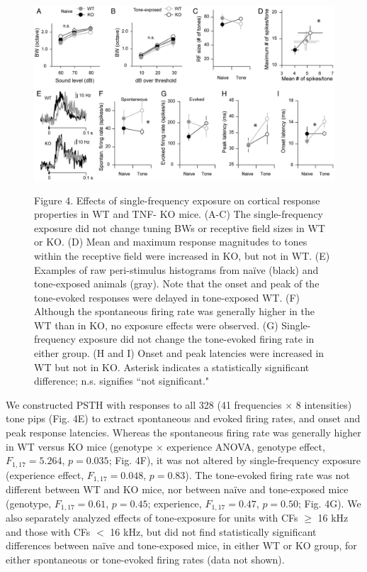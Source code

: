 \begin{figure}[h]
	\centering
		\includegraphics[width=6in]{images/C3F4}
	\begin{changemargin}{1in}{1in}
	\footnotesize{Figure 4. Effects of single-frequency exposure on cortical response properties in WT and TNF-\textalpha{} KO mice. (A-C) The single-frequency exposure did not change tuning BWs or receptive field sizes in WT or KO. (D) Mean and maximum response magnitudes to tones within the receptive field were increased in KO, but not in WT. (E) Examples of raw peri-stimulus histograms from na\"ive (black) and tone-exposed animals (gray). Note that the onset and peak of the tone-evoked responses were delayed in tone-exposed WT. (F) Although the spontaneous firing rate was generally higher in the WT than in KO, no exposure effects were observed. (G) Single-frequency exposure did not change the tone-evoked firing rate in either group. (H and I) Onset and peak latencies were increased in WT but not in KO. Asterisk indicates a statistically significant difference; n.s. signifies ``not significant."}
	\end{changemargin}
\end{figure}

We constructed PSTH with responses to all 328 (41 frequencies $\times$ 8 intensities) tone pips (Fig. 4E) to extract spontaneous and evoked firing rates, and onset and peak response latencies. Whereas the spontaneous firing rate was generally higher in WT versus KO mice (genotype $\times$ experience ANOVA, genotype effect, $F_{1,17}=5.264$, $p=0.035$; Fig. 4F), it was not altered by single-frequency exposure (experience effect, $F_{1,17}=0.048$, $p=0.83$). The tone-evoked firing rate was not different between WT and KO mice, nor between na\"ive and tone-exposed mice (genotype, $F_{1,17}=0.61$, $p=0.45$; experience, $F_{1,17}=0.47$, $p=0.50$; Fig. 4G). We also separately analyzed effects of tone-exposure for units with CFs $\ge$ 16 kHz and those with CFs $<$ 16 kHz, but did not find statistically significant differences between na\"ive and tone-exposed mice, in either WT or KO group, for either spontaneous or tone-evoked firing rates (data not shown).

